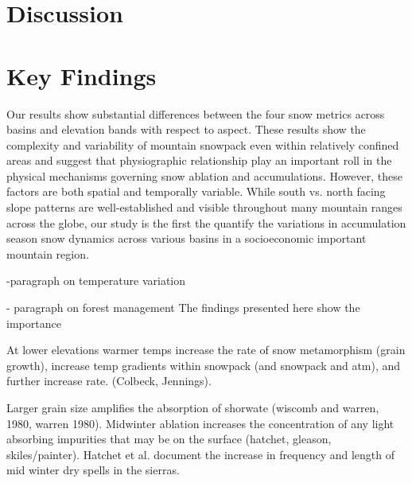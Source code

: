 \hypertarget{ch2-discussion}{\section{Discussion}\label{ch2-discussion}}
\hypertarget{ch2-discussion-1}{\section{Key Findings}\label{ch2-discussion-1}}


Our results show substantial differences between the four snow metrics across basins and elevation bands with respect to aspect. These results show the complexity and variability of mountain snowpack even within relatively confined areas and suggest that physiographic relationship play an important roll in the physical mechanisms governing snow ablation and accumulations. However, these factors are both spatial and temporally variable. While south vs. north facing slope patterns are well-established and visible throughout many mountain ranges across the globe, our study is the first the quantify the variations in accumulation season snow dynamics across various basins in a socioeconomic important mountain region.


-paragraph on temperature variation \citep{kapnickCausesRecentChanges2012}

- paragraph on forest management The findings presented here show the importance 


At lower elevations warmer temps increase the rate of snow metamorphism (grain growth), increase temp gradients within snowpack (and snowpack and atm), and further increase rate. (Colbeck, Jennings). 

Larger grain size amplifies the absorption of shorwate (wiscomb and warren, 1980, warren 1980). Midwinter ablation increases the concentration of any light absorbing impurities that may be on the surface (hatchet, gleason, skiles/painter). Hatchet et al. document the increase in frequency and length of mid winter dry spells in the sierras. 

